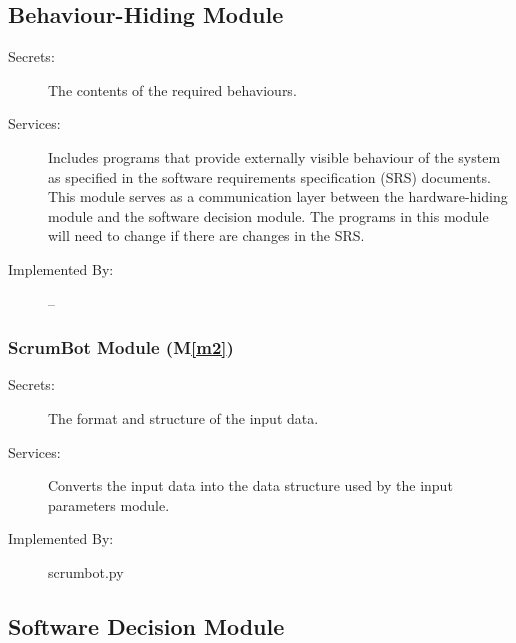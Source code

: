 \documentclass[12pt, titlepage]{article}
\newcommand{\mref}[1]{M\ref{#1}}
\begin{document}
\subsection{Behaviour-Hiding Module}

\begin{description}
\item[Secrets:] The contents of the required behaviours.
\item[Services:] Includes programs that provide externally visible behaviour of
  the system as specified in the software requirements specification (SRS)
  documents. This module serves as a communication layer between the
  hardware-hiding module and the software decision module. The programs in this
  module will need to change if there are changes in the SRS.
\item[Implemented By:] --
\end{description}


\subsubsection{ScrumBot Module (\mref{m2})}
\begin{description}
    \item[Secrets:] The format and structure of the input data.
    \item[Services:] Converts the input data into the data structure used by the input parameters module.
    \item[Implemented By:] scrumbot.py
\end{description}

\subsection{Software Decision Module}
\end{document}
